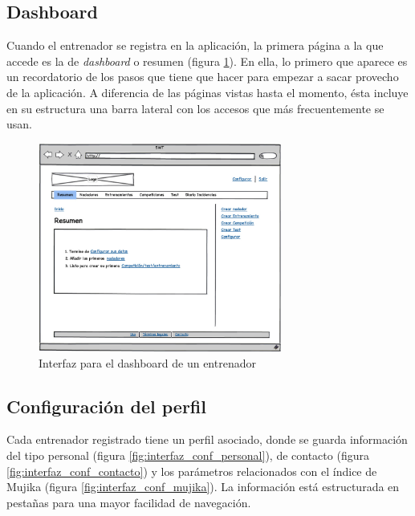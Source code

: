 	\subsection{Dashboard} %
		\label{sub:interfaz_dashboard}
	
	Cuando el entrenador se registra en la aplicación, la primera página a la que accede es la de {\it dashboard} o resumen (figura \ref{fig:interfaz_dashboard}). En ella, lo primero que aparece es un recordatorio de los pasos que tiene que hacer para empezar a sacar provecho de la aplicación. A diferencia de las páginas vistas hasta el momento, ésta incluye en su estructura una barra lateral con los accesos que más frecuentemente se usan.
		
		\begin{figure}[H]
		  \centering
		    \includegraphics[width=8cm]{./eps/p_interfaz/6_Dashboard.eps}
		  \caption{Interfaz para el dashboard de un entrenador}
		  \label{fig:interfaz_dashboard}
		\end{figure}
		
	
	\subsection{Configuración del perfil} %
		\label{sub:configuracion_del_perfil}
	
	Cada entrenador registrado tiene un perfil asociado, donde se guarda información del tipo personal (figura \ref{fig:interfaz_conf_personal}), de contacto (figura \ref{fig:interfaz_conf_contacto}) y los parámetros relacionados con el índice de Mujika (figura \ref{fig:interfaz_conf_mujika}). La información está estructurada en pestañas para una mayor facilidad de navegación.
	
